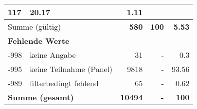 \begin{longtable}{lXrrr}
       \num{117} &
       \num[round-mode=places,round-precision=2]{20,17} &
         \num[round-mode=places,round-precision=2]{1,11} \\
     \midrule
     \multicolumn{2}{l}{Summe (gültig)} &
       \textbf{\num{580}} &
     \textbf{100} &
       \textbf{\num[round-mode=places,round-precision=2]{5,53}} \\
     \multicolumn{5}{l}{\textbf{Fehlende Werte}}\\
       -998 &
       keine Angabe &
         \num{31} &
        - &
         \num[round-mode=places,round-precision=2]{0,3} \\
       -995 &
       keine Teilnahme (Panel) &
         \num{9818} &
        - &
         \num[round-mode=places,round-precision=2]{93,56} \\
       -989 &
       filterbedingt fehlend &
         \num{65} &
        - &
         \num[round-mode=places,round-precision=2]{0,62} \\
     \midrule
     \multicolumn{2}{l}{\textbf{Summe (gesamt)}} &
          \textbf{\num{10494}} &
        \textbf{-} &
        \textbf{100} \\
     \bottomrule
     \end{longtable}
     
